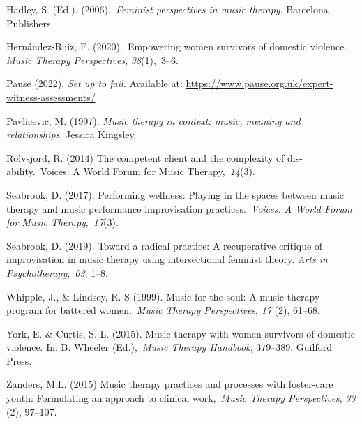 \documentclass[authordate, empirical, issue]{jote-new-article}
\begin{document}
Hadley, S. (Ed.). (2006). \emph{Feminist perspectives in music therapy}. Barcelona Publishers.







Hernández-Ruiz, E. (2020). Empowering women survivors of domestic violence. \emph{Music Therapy Perspectives}, \emph{38}(1), 3--6.







Pause (2022). \emph{Set up to fail. }Available at: \href{https://www.pause.org.uk/expert-witness-assessments/}{https://www.pause.org.uk/expert-witness-assessments/}







Pavlicevic, M. (1997). \emph{Music therapy in context: music, meaning and relationships}. Jessica Kingsley.













Rolvsjord, R. (2014) The competent client and the complexity of dis-ability. Voices: A World Forum for Music Therapy, \emph{14}(3).











Seabrook, D. (2017). Performing wellness: Playing in the spaces between music therapy and music performance improvisation practices. \emph{Voices: A World Forum for Music Therapy}, \emph{17}(3).







Seabrook, D. (2019). Toward a radical practice: A recuperative critique of improvisation in music therapy using intersectional feminist theory. \emph{Arts in Psychotherapy}, \emph{63}, 1--8.







Whipple, J., \& Lindsey, R. S (1999). Music for the soul: A music therapy program for battered women. \emph{Music Therapy Perspectives}, \emph{17} (2), 61--68.







York, E. \& Curtis, S. L. (2015). Music therapy with women survivors of domestic violence. In: B. Wheeler (Ed.), \emph{Music Therapy Handbook}, 379--389. Guilford Press.







Zanders, M.L. (2015) Music therapy practices and processes with foster-care youth: Formulating an approach to clinical work, \emph{Music Therapy Perspectives}, \emph{33} (2), 97--107.
\end{document}

